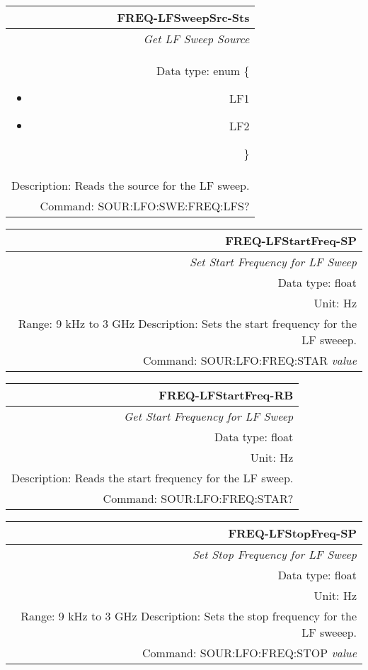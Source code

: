 \documentclass[openany]{article}
\begin{document}
		\begin{tabular}{N}
			\hline
			\bfseries FREQ-LFSweepSrc-Sts \\ \hline
			\emph{Get LF Sweep Source} \\
			Data type: enum \{\begin{itemize}[noitemsep]
				\small
				\item[] LF1
				\item[] LF2
			\end{itemize}\} \\ 
			Description: Reads the source for the LF sweep. \\
			Command: SOUR:LFO:SWE:FREQ:LFS? \\

		\end{tabular}
%
		\begin{tabular}{N}
			\hline
			\bfseries FREQ-LFStartFreq-SP \\ \hline
			\emph{Set Start Frequency for LF Sweep} \\
			Data type: float \\
			Unit: Hz \\ 
			Range: 9 kHz to 3 GHz
			Description: Sets the start frequency for the LF sweeep.\\
			Command: SOUR:LFO:FREQ:STAR \emph{value} \\
			
		\end{tabular}


		\begin{tabular}{N}
			\hline
			\bfseries FREQ-LFStartFreq-RB \\ \hline
			\emph{Get Start Frequency for LF Sweep} \\
			Data type: float \\
			Unit: Hz \\
			Description: Reads the start frequency for the LF sweep. \\
			Command: SOUR:LFO:FREQ:STAR? \\

		\end{tabular}
%
		\begin{tabular}{N}
			\hline
			\bfseries FREQ-LFStopFreq-SP \\ \hline
			\emph{Set Stop Frequency for LF Sweep} \\
			Data type: float \\
			Unit: Hz \\ 
			Range: 9 kHz to 3 GHz
			Description: Sets the stop frequency for the LF sweeep.\\
			Command: SOUR:LFO:FREQ:STOP \emph{value} \\
			
		\end{tabular}
\end{document}
